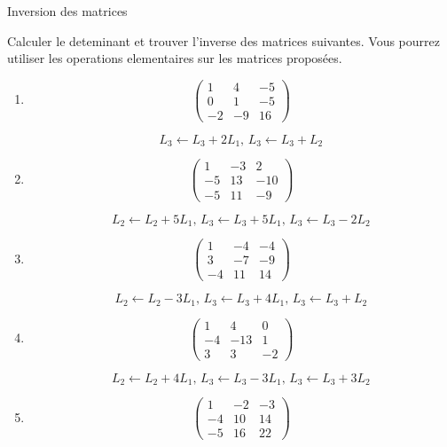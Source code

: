 \documentclass{article}
\begin{document}
\begin{center}
{\Large Inversion des matrices}\\
\end{center}



\noindent
Calculer le deteminant et  trouver l'inverse des matrices suivantes.
Vous pourrez utiliser les operations elementaires sur les matrices proposées.


\begin{enumerate}


\item
$$ \begin{pmatrix}
1 & 4 & -5 \\ 
0 & 1 & -5 \\ 
-2 & -9 & 16
\end{pmatrix} $$


$$ L_3 \leftarrow L_3 + 2L_1,\, 
L_3 \leftarrow L_3 + L_2 $$
\item
$$ \begin{pmatrix}
1 & -3 & 2 \\ 
-5 & 13 & -10 \\ 
-5 & 11 & -9
\end{pmatrix} $$


$$ L_2 \leftarrow L_2 + 5L_1,\, 
L_3 \leftarrow L_3 + 5L_1,\, 
L_3 \leftarrow L_3 - 2L_2 $$
\item
$$ \begin{pmatrix}
1 & -4 & -4 \\ 
3 & -7 & -9 \\ 
-4 & 11 & 14
\end{pmatrix} $$


$$ L_2 \leftarrow L_2 - 3L_1,\, 
L_3 \leftarrow L_3 + 4L_1,\, 
L_3 \leftarrow L_3 + L_2 $$
\item
$$ \begin{pmatrix}
1 & 4 & 0 \\ 
-4 & -13 & 1 \\ 
3 & 3 & -2
\end{pmatrix} $$


$$ L_2 \leftarrow L_2 + 4L_1,\, 
L_3 \leftarrow L_3 - 3L_1,\, 
L_3 \leftarrow L_3 + 3L_2 $$
\item
$$ \begin{pmatrix}
1 & -2 & -3 \\ 
-4 & 10 & 14 \\ 
-5 & 16 & 22
\end{pmatrix} $$


\end{enumerate}
\end{document}
